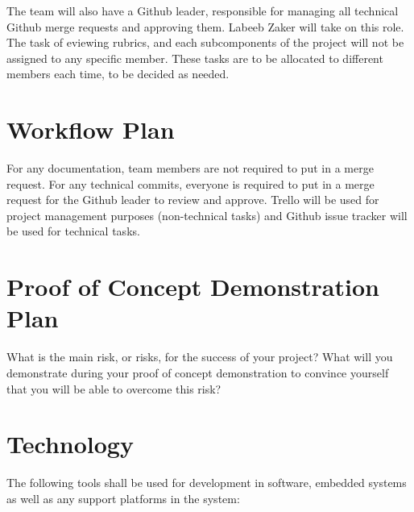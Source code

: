 \documentclass{article}
\begin{document}
The team will also have a Github leader, responsible for managing all technical Github merge requests and approving them. Labeeb Zaker will take on this role.\\

The task of eviewing rubrics, and each subcomponents of the project will not be assigned to any specific member. These tasks are to be allocated to different members each time, to be decided as needed.\\

\section{Workflow Plan}
For any documentation, team members are not required to put in a merge request. For any technical commits, everyone is required to put in a merge request for the Github leader to review and approve. Trello will be used for project management purposes (non-technical tasks) and Github issue tracker will be used for technical tasks.\\

\section{Proof of Concept Demonstration Plan}

What is the main risk, or risks, for the success of your project?  What will you
demonstrate during your proof of concept demonstration to convince yourself that
you will be able to overcome this risk?

\section{Technology}
The following tools shall be used for development in software, embedded systems as well as any support platforms in the system:
\end{document}

